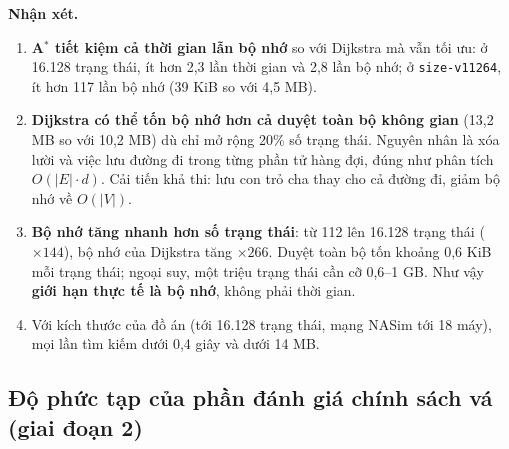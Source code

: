 \documentclass[11pt,a4paper]{article}
\begin{document}
\textbf{Nhận xét.}
\begin{enumerate}
  \item \textbf{A$^{*}$ tiết kiệm cả thời gian lẫn bộ nhớ} so với Dijkstra mà vẫn tối ưu: ở 16.128 trạng thái, ít hơn 2,3 lần thời gian và 2,8 lần bộ nhớ; ở \texttt{size-v11264}, ít hơn 117 lần bộ nhớ (39 KiB so với 4,5 MB).
  \item \textbf{Dijkstra có thể tốn bộ nhớ hơn cả duyệt toàn bộ không gian} (13,2 MB so với 10,2 MB) dù chỉ mở rộng 20\% số trạng thái. Nguyên nhân là xóa lười và việc lưu đường đi trong từng phần tử hàng đợi, đúng như phân tích $O(|E| \cdot d)$. Cải tiến khả thi: lưu con trỏ cha thay cho cả đường đi, giảm bộ nhớ về $O(|V|)$.
  \item \textbf{Bộ nhớ tăng nhanh hơn số trạng thái}: từ 112 lên 16.128 trạng thái ($\times 144$), bộ nhớ của Dijkstra tăng $\times 266$. Duyệt toàn bộ tốn khoảng 0,6 KiB mỗi trạng thái; ngoại suy, một triệu trạng thái cần cỡ 0,6--1 GB. Như vậy \textbf{giới hạn thực tế là bộ nhớ}, không phải thời gian.
  \item Với kích thước của đồ án (tới 16.128 trạng thái, mạng NASim tới 18 máy), mọi lần tìm kiếm dưới 0,4 giây và dưới 14 MB.
\end{enumerate}

\subsection{Độ phức tạp của phần đánh giá chính sách vá (giai đoạn 2)}
\end{document}
